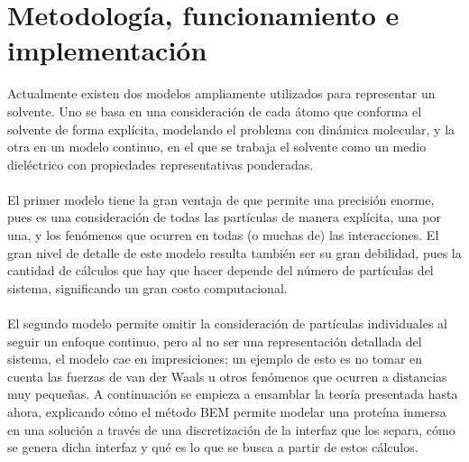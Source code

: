 \documentclass[12pt, oneside, numbers, spanish]{ezthesis}
\numberwithin{equation}{section}
\begin{document}



\chapter{Metodología, funcionamiento e implementación}\label{Chap:Method}
Actualmente existen dos modelos ampliamente utilizados para representar un solvente. Uno se basa en una consideración de cada átomo que conforma el solvente de forma explícita, modelando el problema con dinámica molecular, y la otra en un modelo continuo, en el que se trabaja el solvente como un medio dieléctrico con propiedades representativas ponderadas.\\\\
El primer modelo tiene la gran ventaja de que permite una precisión enorme, pues es una consideración de todas las partículas de manera explícita, una por una, y los fenómenos que ocurren en todas (o muchas de) las interacciones. El gran nivel de detalle de este modelo resulta también ser su gran debilidad, pues la cantidad de cálculos que hay que hacer depende del número de partículas del sistema, significando un gran costo computacional.\\\\
El segundo modelo permite omitir la consideración de partículas individuales al seguir un enfoque continuo, pero al no ser una representación detallada del sistema, el modelo cae en impresiciones; un ejemplo de esto es no tomar en cuenta las fuerzas de van der Waals u otros fenómenos que ocurren a distancias muy pequeñas. A continuación se empieza a ensamblar la teoría presentada hasta ahora, explicando cómo el método BEM permite modelar una proteína inmersa en una solución a través de una discretización de la interfaz que los separa, cómo se genera dicha interfaz y qué es lo que se busca a partir de estos cálculos.
\end{document}

